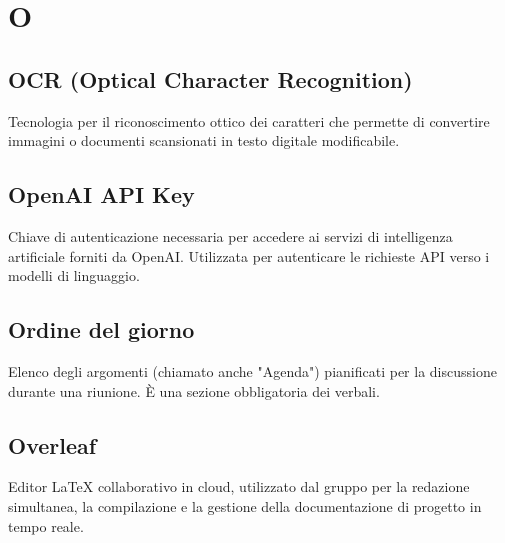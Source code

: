 \documentclass[a4paper, 11pt, oneside]{scrartcl} %
\begin{document}
\vspace{0.5cm}


\section*{O}


\subsection*{OCR (Optical Character Recognition)}
Tecnologia per il riconoscimento ottico dei caratteri che permette di convertire immagini o documenti scansionati in testo digitale modificabile.
\vspace{0.5cm}

\subsection*{OpenAI API Key}


Chiave di autenticazione necessaria per accedere ai servizi di intelligenza artificiale forniti da OpenAI. Utilizzata per autenticare le richieste API verso i modelli di linguaggio.

\vspace{0.5cm}

\subsection*{Ordine del giorno}


Elenco degli argomenti (chiamato anche "Agenda") pianificati per la discussione durante una riunione. È una sezione obbligatoria dei verbali.

\subsection*{Overleaf}
Editor LaTeX collaborativo in cloud, utilizzato dal gruppo per la redazione simultanea, la compilazione e la gestione della documentazione di progetto in tempo reale.
\vspace{0.5cm}

\vspace{0.5cm}
\end{document}
